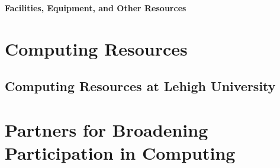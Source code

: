 \documentclass[10pt]{SelfArx}
\begin{document}
\pagestyle{plain}

\begin{center}
{
\color{color1}
\bf \large
  Facilities, Equipment, and Other Resources
 }
%
%
 \end{center}

\section*{Computing Resources}
  
\subsection*{Computing Resources at Lehigh University}
  
\section*{Partners for Broadening Participation in Computing}
 
\end{document}
